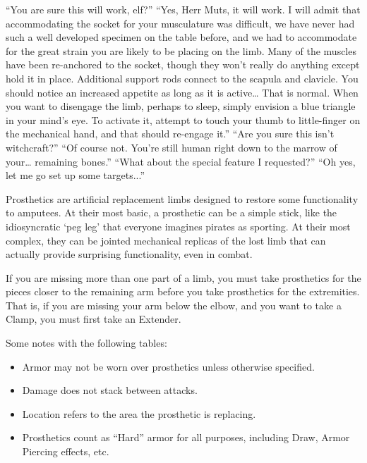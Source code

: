 \documentclass[oneside,11pt,english]{book}
\begin{document}
“You are sure this will work, elf?” 
“Yes, Herr Muts, it will work. I will admit that accommodating the socket for your musculature was difficult, we have never had 
such a well developed specimen on the table before, and we had to accommodate for the great strain you are likely to be placing 
on the limb. Many of the muscles have been re-anchored to the socket, though they won’t really do anything except hold it in 
place. Additional support rods connect to the scapula and clavicle. You should notice an increased appetite as long as it is 
active… That is normal. When you want to disengage the limb, perhaps to sleep, simply envision a blue triangle in your mind’s 
eye. To activate it, attempt to touch your thumb to little-finger on the mechanical hand, and that should re-engage it.” 
“Are you sure this isn’t witchcraft?” 
“Of course not. You’re still human right down to the marrow of your… remaining bones.” 
“What about the special feature I requested?” 
“Oh yes, let me go set up some targets...” 

 

Prosthetics are artificial replacement limbs designed to restore some functionality to amputees. At their 
most basic, a prosthetic can be a simple stick, like the idiosyncratic ‘peg leg’ that everyone imagines 
pirates as sporting. At their most complex, they can be jointed mechanical replicas of the lost limb that 
can actually provide surprising functionality, even in combat. 

 

If you are missing more than one part of a limb, you must take prosthetics for the pieces closer to the 
remaining arm before you take prosthetics for the extremities. That is, if you are missing your arm below 
the elbow, and you want to take a Clamp, you must first take an Extender. 


 

Some notes with the following tables: 
\begin{itemize}
\item Armor may not be worn over prosthetics unless otherwise specified. 
\item Damage does not stack between attacks. 
\item Location refers to the area the prosthetic is replacing. 
\item Prosthetics count as “Hard” armor for all purposes, including Draw, Armor Piercing effects, etc. 
\end{itemize}
 
\end{document}
